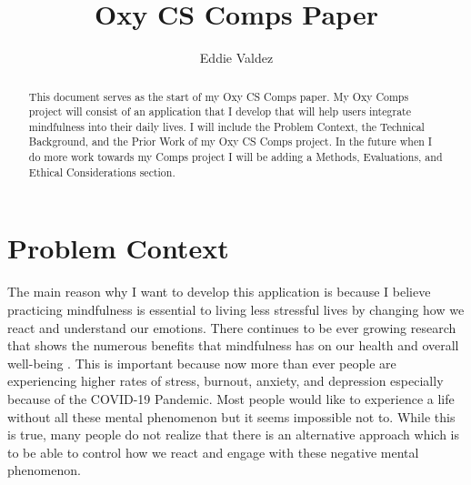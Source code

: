 \documentclass[10pt,twocolumn]{article}
\title{Oxy CS Comps Paper}
\author{Eddie Valdez}
\affiliation{Occidental College}
\begin{document}
\maketitle

\begin{abstract}
    This document serves as the start of my Oxy CS Comps paper. My Oxy Comps project will consist of an application that I develop that will help users integrate mindfulness into their daily lives. I will include the Problem Context, the Technical Background, and the Prior Work of my Oxy CS Comps project. In the future when I do more work towards my Comps project I will be adding a Methods, Evaluations, and Ethical Considerations section.
\end{abstract}

\section{Problem Context}


The main reason why I want to develop this application is because I believe practicing mindfulness is essential to living less stressful lives by changing how we react and understand our emotions. There continues to be ever growing research that shows the numerous benefits that mindfulness has on our health and overall well-being . This is important because now more than ever people are experiencing higher rates of stress, burnout, anxiety, and depression especially because of the COVID-19 Pandemic. Most people would like to experience a life without all these mental phenomenon but it seems impossible not to. While this is true, many people do not realize that there is an alternative approach which is to be able to control how we react and engage with these negative mental phenomenon. 
\end{document}

